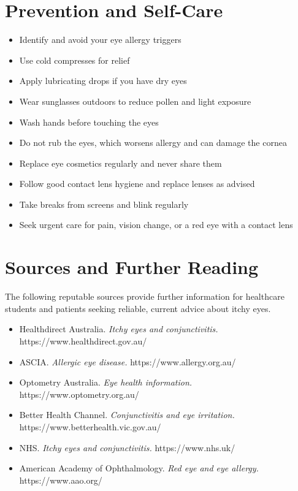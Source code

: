 \section*{Prevention and Self-Care}
\begin{itemize}
    \item Identify and avoid your eye allergy triggers
    \item Use cold compresses for relief
    \item Apply lubricating drops if you have dry eyes
    \item Wear sunglasses outdoors to reduce pollen and light exposure
    \item Wash hands before touching the eyes
    \item Do not rub the eyes, which worsens allergy and can damage the cornea
    \item Replace eye cosmetics regularly and never share them
    \item Follow good contact lens hygiene and replace lenses as advised
    \item Take breaks from screens and blink regularly
    \item Seek urgent care for pain, vision change, or a red eye with a contact lens
\end{itemize}

\section*{Sources and Further Reading}
The following reputable sources provide further information for healthcare students and patients seeking reliable, current advice about itchy eyes.
\begin{itemize}
    \item Healthdirect Australia. \textit{Itchy eyes and conjunctivitis.} https://www.healthdirect.gov.au/
    \item ASCIA. \textit{Allergic eye disease.} https://www.allergy.org.au/
    \item Optometry Australia. \textit{Eye health information.} https://www.optometry.org.au/
    \item Better Health Channel. \textit{Conjunctivitis and eye irritation.} https://www.betterhealth.vic.gov.au/
    \item NHS. \textit{Itchy eyes and conjunctivitis.} https://www.nhs.uk/
    \item American Academy of Ophthalmology. \textit{Red eye and eye allergy.} https://www.aao.org/
\end{itemize}
